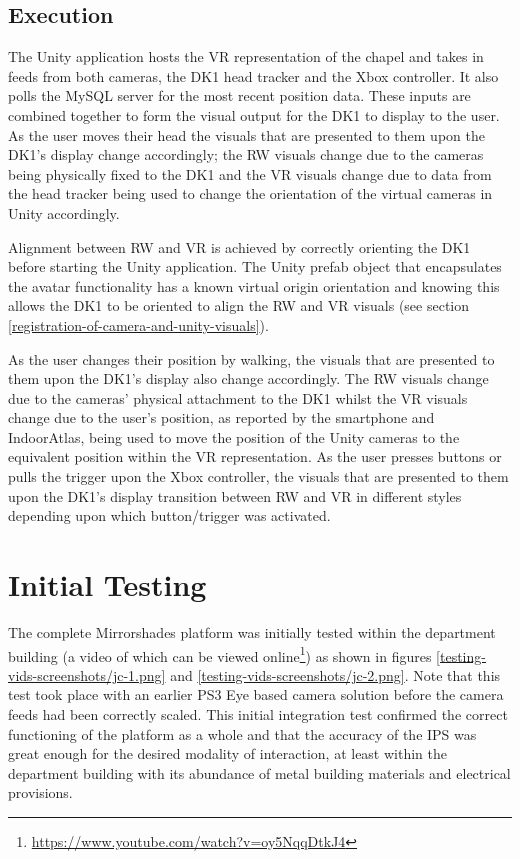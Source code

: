 \subsection{Execution}
The Unity application hosts the VR representation of the chapel and takes in feeds from both cameras, the DK1 head tracker and the Xbox controller. It also polls the MySQL server for the most recent position data. These inputs are combined together to form the visual output for the DK1 to display to the user. As the user moves their head the visuals that are presented to them upon the DK1's display change accordingly; the RW visuals change due to the cameras being physically fixed to the DK1 and the VR visuals change due to data from the head tracker being used to change the orientation of the virtual cameras in Unity accordingly.

Alignment between RW and VR is achieved by correctly orienting the DK1 before starting the Unity application. The Unity prefab object that encapsulates the avatar functionality has a known virtual origin orientation and knowing this allows the DK1 to be oriented to align the RW and VR visuals (see section \ref{registration-of-camera-and-unity-visuals}).

As the user changes their position by walking, the visuals that are presented to them upon the DK1's display also change accordingly. The RW visuals change due to the cameras' physical attachment to the DK1 whilst the VR visuals change due to the user's position, as reported by the smartphone and IndoorAtlas, being used to move the position of the Unity cameras to the equivalent position within the VR representation. As the user presses buttons or pulls the trigger upon the Xbox controller, the visuals that are presented to them upon the DK1's display transition between RW and VR in different styles depending upon which button/trigger was activated.


\section{Initial Testing}
\label{initial-testing}
The complete Mirrorshades platform was initially tested within the department building (a video of which can be viewed online\footnote{\url{https://www.youtube.com/watch?v=oy5NqqDtkJ4}}) as shown in figures \ref{testing-vids-screenshots/jc-1.png} and \ref{testing-vids-screenshots/jc-2.png}. Note that this test took place with an earlier PS3 Eye based camera solution before the camera feeds had been correctly scaled. This initial integration test confirmed the correct functioning of the platform as a whole and that the accuracy of the IPS was great enough for the desired modality of interaction, at least within the department building with its abundance of metal building materials and electrical provisions.

